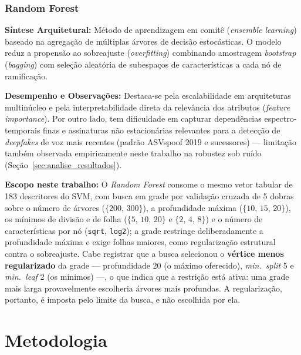 \documentclass[12pt,a4paper]{article}
\begin{document}
\subsubsection[Random Forest]{Random Forest~\cite{breiman2001random}}
\textbf{Síntese Arquitetural:} Método de aprendizagem em comitê (\textit{ensemble learning}) baseado na agregação de múltiplas árvores de decisão estocásticas. O modelo reduz a propensão ao sobreajuste (\textit{overfitting}) combinando amostragem \textit{bootstrap} (\textit{bagging}) com seleção aleatória de subespaços de características a cada nó de ramificação.
\par\textbf{Desempenho e Observações:} Destaca-se pela escalabilidade em arquiteturas multinúcleo e pela interpretabilidade direta da relevância dos atributos (\textit{feature importance}). Por outro lado, tem dificuldade em capturar dependências espectro-temporais finas e assinaturas não estacionárias relevantes para a detecção de \textit{deepfakes} de voz mais recentes (padrão ASVspoof 2019 e sucessores) --- limitação também observada empiricamente neste trabalho na robustez sob ruído (Seção~\ref{sec:analise_resultados}).
\par\textbf{Escopo neste trabalho:} O \textit{Random Forest} consome o mesmo vetor tabular de \num{183} descritores do SVM, com busca em grade por validação cruzada de \num{5} dobras sobre o número de árvores ($\{200,\, 300\}$), a profundidade máxima ($\{10,\, 15,\, 20\}$), os mínimos de divisão e de folha ($\{5,\, 10,\, 20\}$ e $\{2,\, 4,\, 8\}$) e o número de características por nó (\texttt{sqrt}, \texttt{log2}); a grade restringe deliberadamente a profundidade máxima e exige folhas maiores, como regularização estrutural contra o sobreajuste. Cabe registrar que a busca selecionou o \textbf{vértice menos regularizado} da grade --- profundidade \num{20} (o máximo oferecido), \textit{min.\ split} \num{5} e \textit{min.\ leaf} \num{2} (os mínimos) ---, o que indica que a restrição está ativa: uma grade mais larga provavelmente escolheria árvores mais profundas. A regularização, portanto, é imposta pelo limite da busca, e não escolhida por ela.



\newpage




\section{Metodologia}
\label{sec:metodologia}
\end{document}
